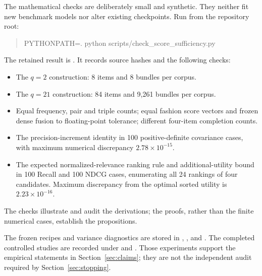 \documentclass[11pt,a4paper]{article}
\begin{document}
The mathematical checks are deliberately small and synthetic. They neither
fit new benchmark models nor alter existing checkpoints. Run from the
repository root:
\begin{quote}\ttfamily\small
PYTHONPATH=. python scripts/check\_score\_sufficiency.py
\end{quote}
The retained result is
.
It records source hashes and the following checks:
\begin{itemize}
\item The $q=2$ construction: 8 items and 8 bundles per corpus.
\item The $q=21$ construction: 84 items and 9,261 bundles per corpus.
\item Equal frequency, pair and triple counts; equal fashion score vectors
and frozen dense fusion to floating-point tolerance; different four-item
completion counts.
\item The precision-increment identity in 100 positive-definite covariance
cases, with maximum numerical discrepancy $2.78\times10^{-15}$.
\item The expected normalized-relevance ranking rule and additional-utility
bound in 100 Recall and 100 NDCG cases, enumerating all 24 rankings of
four candidates. Maximum discrepancy from the optimal sorted utility is
$2.23\times10^{-16}$.
\end{itemize}
The checks illustrate and audit the derivations; the proofs, rather than
the finite numerical cases, establish the propositions.

The frozen recipes and variance diagnostics are stored in
,
, and
.
The completed controlled studies are recorded under
 and
.
Those experiments support the empirical statements in
Section~\ref{sec:claims}; they are not the independent audit required by
Section~\ref{sec:stopping}.
\end{document}
